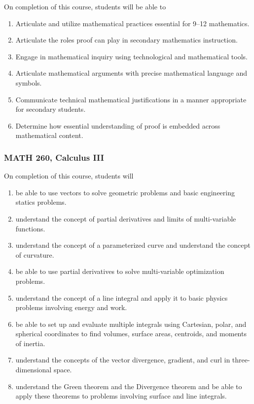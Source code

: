 \documentclass[10pt]{article}
\newenvironment{alphalist}{
\begin{enumerate}[label=(\arabic*),widest=107 ,leftmargin=25pt, itemsep=0pt]}
{\end{enumerate}}
\begin{document}
On completion of this course, students will be able to
\begin{alphalist}
\item Articulate and utilize mathematical practices essential for 9--12 mathematics.  
\item Articulate the roles proof can play in secondary mathematics instruction.
\item Engage in mathematical inquiry using technological and mathematical tools.
\item Articulate mathematical arguments with precise mathematical language and symbols.
\item Communicate technical mathematical justifications in a manner appropriate for secondary students.
\item Determine how essential understanding of proof is embedded across mathematical content.
\end{alphalist}

\subsubsection*{MATH 260, Calculus III}


On completion of this course, students will 
\begin{alphalist} 
    \item be able to use vectors to solve geometric problems and basic engineering statics problems.
    \item understand the concept of partial derivatives and limits of multi-variable functions.
    \item understand the concept of a parameterized curve and understand the concept of curvature.
    \item be able to use partial derivatives to solve multi-variable optimization problems.
    \item understand the concept of a line integral and apply it to basic physics problems involving energy and work.
    \item be able to set up and evaluate multiple integrals using Cartesian, polar, and spherical coordinates to find volumes, 
    surface areas, centroids, and moments of inertia.
    \item understand the concepts of the vector divergence, gradient, and curl in 
    three-dimensional space.
    \item understand the Green theorem and the Divergence theorem and be able to 
    apply these theorems to problems involving surface and line integrals.
\end{alphalist}
\end{document}
